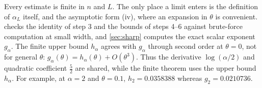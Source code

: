 Every estimate is finite in $n$ and $L$. The only place a limit enters is the definition of $\alpha_L$ itself, and the asymptotic form (iv), where an expansion in $\theta$ is convenient.  checks the identity of step 3 and the bounds of steps 4--6 against brute-force computation at small width, and \cref{sec:sharp} computes the exact scalar exponent $g_\alpha$. The finite upper bound $h_\alpha$ agrees with $g_\alpha$ through second order at $\theta=0$, not for general $\theta$: $g_\alpha(\theta)=h_\alpha(\theta)+O(\theta^3)$. Thus the derivative $\log(\alpha/2)$ and quadratic coefficient $\tfrac52$ are shared, while the finite theorem uses the upper bound $h_\alpha$. For example, at $\alpha=2$ and $\theta=0.1$, $h_2=0.0358388$ whereas $g_2=0.0210736$.
